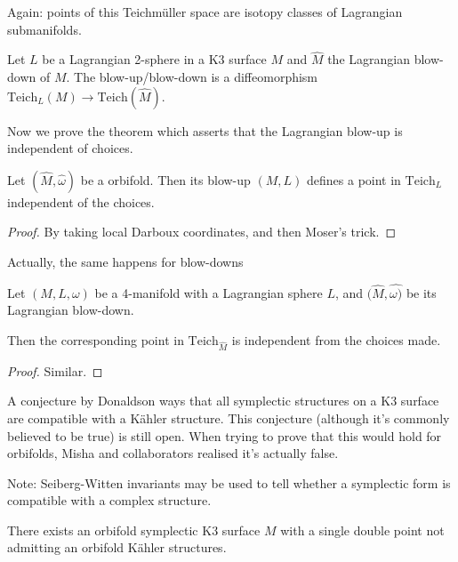 \noindent
Again: points of this Teichmüller space are isotopy classes
of Lagrangian submanifolds.

\medskip\noindent
\begin{theorem}
\label{theorem-blow-down-diffeomorphism}
Let $L$ be a Lagrangian 2-sphere in a K3 surface  $M$
and $\hat{M}$ the Lagrangian blow-down of $M$.
The blow-up/blow-down
is a diffeomorphism $\text{Teich}_L(M) \to \text{Teich}(\hat{M})$.
\end{theorem}

\medskip\noindent
Now we prove the theorem which asserts that the Lagrangian
blow-up is independent of choices.

\begin{theorem}
\label{theorem-theorem-lagrangian-blow-up-well-defined}
Let $(\hat{M},\hat{\omega})$ be a orbifold. Then its blow-up
$(M,L)$ defines a point in $\text{Teich}_L$ independent of the choices.
\end{theorem}

\begin{proof}
By taking local Darboux coordinates, and then Moser's trick.
\end{proof}

\noindent
Actually, the same happens for blow-downs

\begin{theorem}
\label{theorem-same-for-blow-down}
Let $(M,L,\omega)$ be a 4-manifold with a Lagrangian sphere $L$, and
$(\hat{M},\hat{\omega)}$ be its Lagrangian blow-down.

Then the corresponding point in $\text{Teich}_{\hat{M}}$ is
independent from the choices made.
\end{theorem}

\begin{proof}
Similar.
\end{proof}

\medskip\noindent
A conjecture by Donaldson ways that all symplectic structures on a K3
surface are compatible with a Kähler structure. This conjecture
(although it's commonly believed to be true) is still open.
When trying to prove that this would hold for orbifolds,
Misha and collaborators realised it's actually false.

Note: Seiberg-Witten invariants may be used to tell whether a symplectic
form is compatible with a complex structure.

\begin{theorem}
\label{theorem-conjecture-false-for-orbifolds}
There exists an orbifold symplectic K3 surface $M$ with a single
double point not admitting an orbifold Kähler structures.
\end{theorem}

